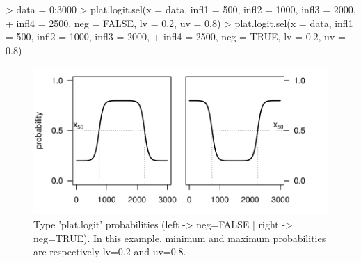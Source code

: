\documentclass[letterpaper, 12pt]{article}
\begin{document}
\begin{Schunk}
\begin{Sinput}
> data = 0:3000
> plat.logit.sel(x = data, infl1 = 500, infl2 = 1000, infl3 = 2000, 
+     infl4 = 2500, neg = FALSE, lv = 0.2, uv = 0.8)
> plat.logit.sel(x = data, infl1 = 500, infl2 = 1000, infl3 = 2000, 
+     infl4 = 2500, neg = TRUE, lv = 0.2, uv = 0.8)
\end{Sinput}
\end{Schunk}
\begin{figure}[h]
\vspace{-20pt}
\begin{center}
\includegraphics{relation_sel-031}
\end{center}
\vspace{-30pt}
\caption{Type 'plat.logit' probabilities (left -> neg=FALSE |  right -> neg=TRUE). In this example, minimum and maximum probabilities are respectively lv=0.2 and uv=0.8.}
\vspace{-20pt}
\label{fig15}
\end{figure}
\end{document}
